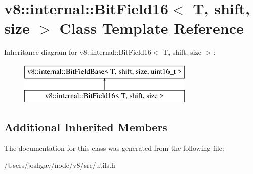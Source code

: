 \hypertarget{classv8_1_1internal_1_1_bit_field16}{}\section{v8\+:\+:internal\+:\+:Bit\+Field16$<$ T, shift, size $>$ Class Template Reference}
\label{classv8_1_1internal_1_1_bit_field16}
Inheritance diagram for v8\+:\+:internal\+:\+:Bit\+Field16$<$ T, shift, size $>$\+:\begin{figure}[H]
\begin{center}
\leavevmode
\includegraphics[height=2.000000cm]{classv8_1_1internal_1_1_bit_field16}
\end{center}
\end{figure}
\subsection*{Additional Inherited Members}


The documentation for this class was generated from the following file\+:\begin{DoxyCompactItemize}
\item 
/\+Users/joshgav/node/v8/src/utils.\+h\end{DoxyCompactItemize}
